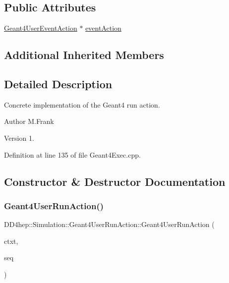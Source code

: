 \subsection*{Public Attributes}
\begin{DoxyCompactItemize}
\item 
\hyperlink{class_d_d4hep_1_1_simulation_1_1_geant4_user_event_action}{Geant4\+User\+Event\+Action} $\ast$ \hyperlink{class_d_d4hep_1_1_simulation_1_1_geant4_user_run_action_a6726ebc3d952df848fc4e8288d3bb6c0}{event\+Action}
\end{DoxyCompactItemize}
\subsection*{Additional Inherited Members}


\subsection{Detailed Description}
Concrete implementation of the Geant4 run action. 

\begin{DoxyAuthor}{Author}
M.\+Frank 
\end{DoxyAuthor}
\begin{DoxyVersion}{Version}
1. 
\end{DoxyVersion}


Definition at line 135 of file Geant4\+Exec.\+cpp.



\subsection{Constructor \& Destructor Documentation}
\hypertarget{class_d_d4hep_1_1_simulation_1_1_geant4_user_run_action_a4619583991588e3f0e3d51da6082bac3}{}\label{class_d_d4hep_1_1_simulation_1_1_geant4_user_run_action_a4619583991588e3f0e3d51da6082bac3} 
\subsubsection{\texorpdfstring{Geant4\+User\+Run\+Action()}{Geant4UserRunAction()}}
{\footnotesize\ttfamily D\+D4hep\+::\+Simulation\+::\+Geant4\+User\+Run\+Action\+::\+Geant4\+User\+Run\+Action (\begin{DoxyParamCaption}\item[{\hyperlink{class_d_d4hep_1_1_simulation_1_1_geant4_context}{Geant4\+Context} $\ast$}]{ctxt,  }\item[{\hyperlink{class_d_d4hep_1_1_simulation_1_1_geant4_run_action_sequence}{Geant4\+Run\+Action\+Sequence} $\ast$}]{seq }\end{DoxyParamCaption})\hspace{0.3cm}{\ttfamily [inline]}}



